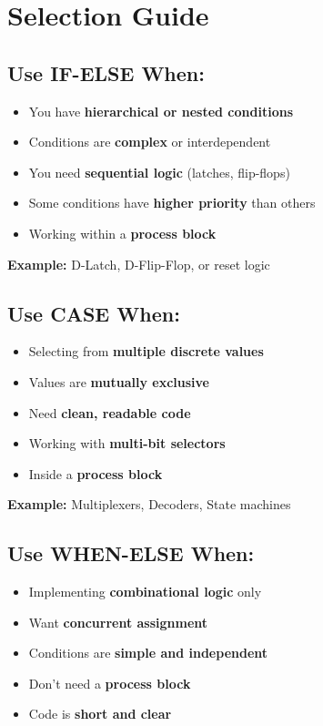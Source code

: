 \documentclass[12pt,a4paper]{article}
\begin{document}
\newpage
\section{Selection Guide}

\subsection{Use IF-ELSE When:}
\begin{itemize}
    \item You have \textbf{hierarchical or nested conditions}
    \item Conditions are \textbf{complex} or interdependent
    \item You need \textbf{sequential logic} (latches, flip-flops)
    \item Some conditions have \textbf{higher priority} than others
    \item Working within a \textbf{process block}
\end{itemize}

\textbf{Example:} D-Latch, D-Flip-Flop, or reset logic

\subsection{Use CASE When:}
\begin{itemize}
    \item Selecting from \textbf{multiple discrete values}
    \item Values are \textbf{mutually exclusive}
    \item Need \textbf{clean, readable code}
    \item Working with \textbf{multi-bit selectors}
    \item Inside a \textbf{process block}
\end{itemize}

\textbf{Example:} Multiplexers, Decoders, State machines

\subsection{Use WHEN-ELSE When:}
\begin{itemize}
    \item Implementing \textbf{combinational logic} only
    \item Want \textbf{concurrent assignment}
    \item Conditions are \textbf{simple and independent}
    \item Don't need a \textbf{process block}
    \item Code is \textbf{short and clear}
\end{itemize}
\end{document}
